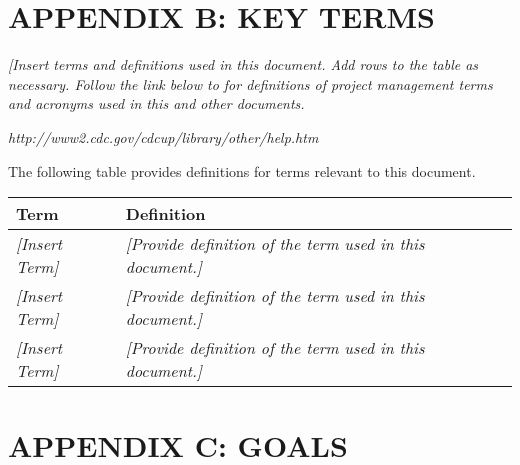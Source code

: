 \documentclass[a4paper, 11pt]{article}
\begin{document}
\newpage


\section{APPENDIX B: KEY TERMS}

\emph{{[}Insert terms and definitions used in this document. Add rows to
the table as necessary. Follow the link below to for definitions of
project management terms and acronyms used in this and other documents.}

\emph{http://www2.cdc.gov/cdcup/library/other/help.htm}

The following table provides definitions for terms relevant to this
document.

\begin{longtable}[]{@{}ll@{}}
\toprule
\textbf{Term} & \textbf{Definition}\tabularnewline
\midrule
\endhead
\emph{{[}Insert Term{]}} & \emph{{[}Provide definition of the term used
in this document.{]}}\tabularnewline
\emph{{[}Insert Term{]}} & \emph{{[}Provide definition of the term used
in this document.{]}}\tabularnewline
\emph{{[}Insert Term{]}} & \emph{{[}Provide definition of the term used
in this document.{]}}\tabularnewline
\bottomrule
\end{longtable}

\newpage


\section{APPENDIX C: GOALS}
\end{document}
